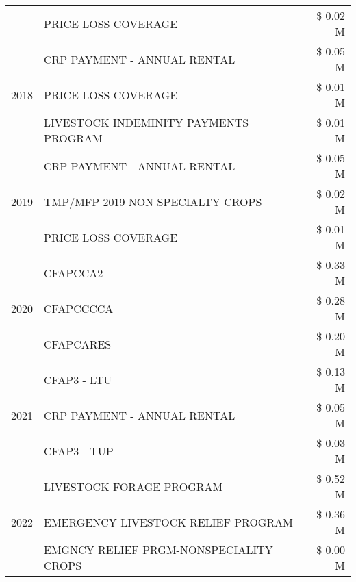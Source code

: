 \begin{tabular}{llr}
 & PRICE LOSS COVERAGE & \$ 0.02 M \\
\cline{1-3}
\multirow[t]{3}{*}{2018} & CRP PAYMENT - ANNUAL RENTAL & \$ 0.05 M \\
 & PRICE LOSS COVERAGE & \$ 0.01 M \\
 & LIVESTOCK INDEMINITY PAYMENTS PROGRAM & \$ 0.01 M \\
\cline{1-3}
\multirow[t]{3}{*}{2019} & CRP PAYMENT - ANNUAL RENTAL & \$ 0.05 M \\
 & TMP/MFP 2019 NON SPECIALTY CROPS & \$ 0.02 M \\
 & PRICE LOSS COVERAGE & \$ 0.01 M \\
\cline{1-3}
\multirow[t]{3}{*}{2020} & CFAPCCA2 & \$ 0.33 M \\
 & CFAPCCCCA & \$ 0.28 M \\
 & CFAPCARES & \$ 0.20 M \\
\cline{1-3}
\multirow[t]{3}{*}{2021} & CFAP3 - LTU & \$ 0.13 M \\
 & CRP PAYMENT - ANNUAL RENTAL & \$ 0.05 M \\
 & CFAP3 - TUP & \$ 0.03 M \\
\cline{1-3}
\multirow[t]{3}{*}{2022} & LIVESTOCK FORAGE PROGRAM & \$ 0.52 M \\
 & EMERGENCY LIVESTOCK RELIEF PROGRAM & \$ 0.36 M \\
 & EMGNCY RELIEF PRGM-NONSPECIALITY CROPS & \$ 0.00 M \\
\cline{1-3}
\bottomrule
\end{tabular}
